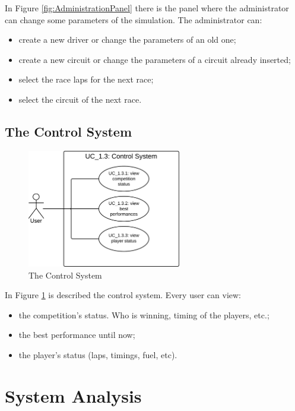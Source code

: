 In Figure \ref{fig:AdministrationPanel} there is the panel where the administrator can change some parameters of the simulation. The administrator can:
\begin{itemize}
\item create a new driver or change the parameters of an old one;
\item create a new circuit or change the parameters of a circuit already inserted;
\item select the race laps for the next race;
\item select the circuit of the next race.
\end{itemize}

\subsection{The Control System}

\begin{figure}[H]
\centering %
\includegraphics[width=0.6\textwidth]{./img/UML/ControlSystem.png}
\caption{The Control System}
\label{fig:ControlSystem}
\end{figure}

In Figure \ref{fig:ControlSystem} is described the control system. Every user can view:
\begin{itemize}
\item the competition's status. Who is winning, timing of the players, etc.;
\item the best performance until now;
\item the player's status (laps, timings, fuel, etc).
\end{itemize}

\section{System Analysis}

